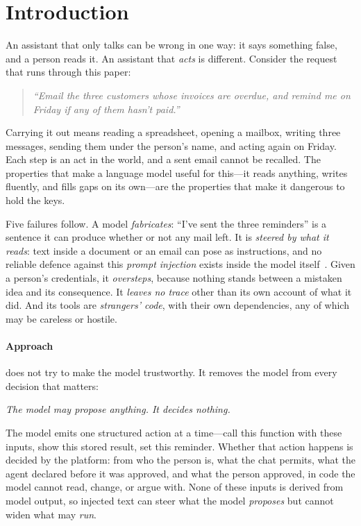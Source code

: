 \section{Introduction}
\label{sec:intro}

An assistant that only talks can be wrong in one way: it says
something false, and a person reads it. An assistant that \emph{acts}
is different. Consider the request that runs through this paper:

\begin{quote}\itshape
``Email the three customers whose invoices are overdue, and remind me
on Friday if any of them hasn't paid.''
\end{quote}

\noindent Carrying it out means reading a spreadsheet, opening a
mailbox, writing three messages, sending them under the person's name,
and acting again on Friday. Each step is an act in the world, and a
sent email cannot be recalled. The properties that make a language
model useful for this---it reads anything, writes fluently, and fills
gaps on its own---are the properties that make it dangerous to hold
the keys.

Five failures follow. A model \emph{fabricates}: ``I've sent the three
reminders'' is a sentence it can produce whether or not any mail left.
It is \emph{steered by what it reads}: text inside a document or an
email can pose as instructions, and no reliable defence against this
\emph{prompt injection} exists inside the model
itself~\cite{greshake2023indirect,perez2022ignore}. Given a person's
credentials, it \emph{oversteps}, because nothing stands between a
mistaken idea and its consequence. It \emph{leaves no trace} other than
its own account of what it did. And its tools are \emph{strangers'
code}, with their own dependencies, any of which may be careless or
hostile.

\paragraph{Approach}
\sys{} does not try to make the model trustworthy. It removes the
model from every decision that matters:

\begin{center}
\emph{The model may propose anything. It decides nothing.}
\end{center}

\noindent The model emits one structured action at a time---call this
function with these inputs, show this stored result, set this
reminder. Whether that action happens is decided by the platform: from
who the person is, what the chat permits, what the agent declared
before it was approved, and what the person approved, in code the
model cannot read, change, or argue with. None of these inputs is
derived from model output, so injected text can steer what the model
\emph{proposes} but cannot widen what may \emph{run}.

